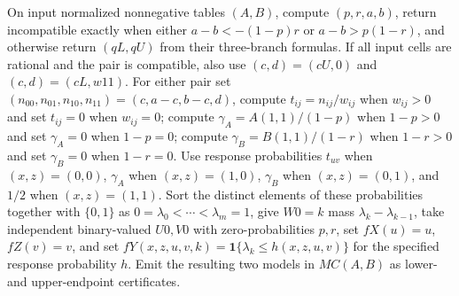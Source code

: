 On input normalized nonnegative tables \((A,B)\), compute \((p,r,a,b)\), return incompatible exactly when either \(a-b<-(1-p)r\) or \(a-b>p(1-r)\), and otherwise return \((qL,qU)\) from their three-branch formulas.  If all input cells are rational and the pair is compatible, also use \((c,d)=(cU,0)\) and \((c,d)=(cL,w11)\).  For either pair set \((n_{00},n_{01},n_{10},n_{11})=(c,a-c,b-c,d)\), compute \(t_{ij}=n_{ij}/w_{ij}\) when \(w_{ij}>0\) and set \(t_{ij}=0\) when \(w_{ij}=0\); compute \(\gamma_A=A(1,1)/(1-p)\) when \(1-p>0\) and set \(\gamma_A=0\) when \(1-p=0\); compute \(\gamma_B=B(1,1)/(1-r)\) when \(1-r>0\) and set \(\gamma_B=0\) when \(1-r=0\).  Use response probabilities \(t_{uv}\) when \((x,z)=(0,0)\), \(\gamma_A\) when \((x,z)=(1,0)\), \(\gamma_B\) when \((x,z)=(0,1)\), and \(1/2\) when \((x,z)=(1,1)\).  Sort the distinct elements of these probabilities together with \(\{0,1\}\) as \(0=\lambda_0<\cdots<\lambda_m=1\), give \(W0=k\) mass \(\lambda_k-\lambda_{k-1}\), take independent binary-valued \(U0,V0\) with zero-probabilities \(p,r\), set \(fX(u)=u\), \(fZ(v)=v\), and set \(fY(x,z,u,v,k)=\mathbf 1\{\lambda_k\le h(x,z,u,v)\}\) for the specified response probability \(h\).  Emit the resulting two models in \(MC(A,B)\) as lower- and upper-endpoint certificates.

